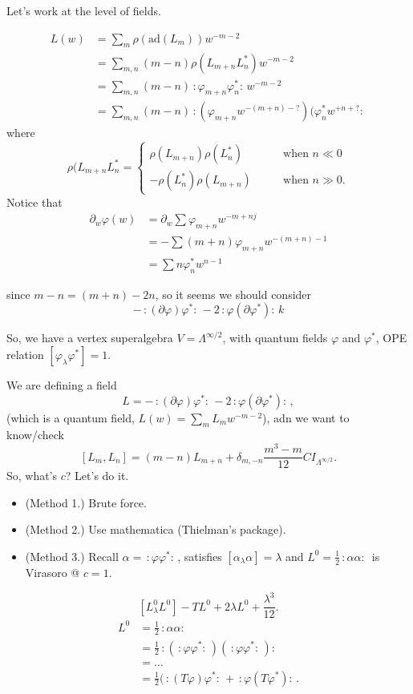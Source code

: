\medskip\noindent
Let's work at the level of fields.

\begin{align*}
L(w)&=\sum_m \rho(\text{ad}(L_m)) w^{-m-2}\\
&=\sum_{m,n}(m-n)\rho(L_{m+n}L_n^*)w^{-m-2}\\
&=\sum_{m,n}(m-n)\,:\!\varphi_{m+n}\varphi^*_n\!:\,w^{-m-2}\\
&=\sum_{m,n}(m-n)\,:\!(\varphi_{m+n}w^{-(m+n)-?})
(\varphi_n^*w^{+n+?}\!:\,
\end{align*}
where
$$
\rho(L_{m+n}L_n^* =\begin{cases}
\rho(L_{m+n})\rho(L_n^*)\qquad &\text{when $n\ll 0$} \\
-\rho(L^*_n)\rho(L_{m+n})\qquad &\text{when }n\gg 0.
\end{cases}
$$
Notice that
\begin{align*}
\partial_w\varphi(w)&=\partial_w \sum \varphi_{m+n}w^{-m+nj}\\
&=-\sum(m+n)\varphi_{m+n}w^{-(m+n)-1}\\
&=\sum n \varphi_n^* w^{n-1}
\end{align*}

\noindent
since $m-n=(m+n)-2n$,
so it seems we should consider
$$
-\,:\!(\partial \varphi)\varphi^*\!:\,
-2\,:\!\varphi(\partial \varphi^*)\!:\,k
$$

\medskip\noindent
So, we have a vertex superalgebra
$V=\Lambda^{\infty/2}$, with quantum fields
$\varphi$ and $\varphi^*$, OPE relation
$[\varphi_\lambda \varphi^*]=1$.

We are defining a field
$$
L=-\,:\!(\partial \varphi)\varphi^*:\,
-2\,:\!\varphi(\partial \varphi^*)\!:\,,
$$
(which is a quantum field, $L(w)=\sum_m L_mw^{-m-2}$),
adn we want to know/check
$$
[L_m,L_n]=(m-n)L_{m+n}+\delta_{m,-n}\frac{m^3-m}{12}CI_{\Lambda^{\infty/2}}.
$$
So, what's $c$? Let's do it.

\begin{itemize}
\item (Method 1.) Brute force.
\item (Method 2.) Use mathematica (Thielman's package).
\item (Method 3.) Recall $\alpha=\,:\!\varphi \varphi^*\!:\,$,
satisfies $[\alpha_\lambda \alpha]=\lambda$ and
$L^0=\frac{1}{2}\,:\!\alpha \alpha\!:\,$
is Virasoro @ $c=1$.
\end{itemize}
$$
[L^0_\lambda L^0]-TL^0+2\lambda L^0+\frac{\lambda^3}{12}.
$$
\begin{align*}
L^0&=\frac{1}{2}\,:\!\alpha \alpha\!:\,\\
&=\frac{1}{2}
\,:\!(\,:\!\varphi \varphi^*\!:\,)(\,:\!\varphi \varphi^*\!:\,)\!:\,\\
&=\ldots\\
&=\frac{1}{2}(\,:\!(T\varphi)\varphi^*\!:\,+\,:\!\varphi(T\varphi^*)\!:\,.
\end{align*}

